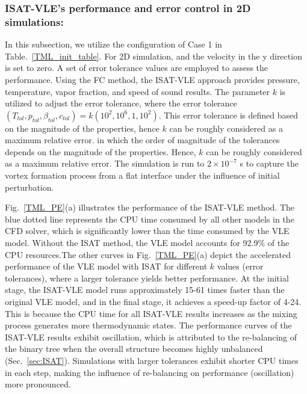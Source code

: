 \subsubsection{ISAT-VLE's performance and error control in 2D simulations:}





In this subsection, we utilize the configuration of Case 1 in Table.~\ref{TML_init_table}. For 2D simulation, and the velocity in the y direction is set to zero. A set of error tolerance values are employed to assess the performance.  Using the FC method, the ISAT-VLE approach provides pressure, temperature, vapor fraction, and speed of sound results. The parameter $k$ is utilized to adjust the error tolerance, where the error tolerance $(T_{tol},p_{tol},\beta_{tol},c_{tol})= k (10^2, 10^6, 1, 10^2)$. This error tolerance is defined based on the magnitude of the properties, hence $k$ can be roughly considered as a maximum relative error. in which the order of magnitude of the tolerances depends on the magnitude of the properties. Hence, $k$ can be roughly considered as a maximum relative error. The simulation is run to $2\times 10^{-7}$ s to capture the vortex formation process from a flat interface under the influence of initial perturbation. 

Fig.~\ref{TML_PE}(a) illustrates the performance of the ISAT-VLE method. The blue dotted line represents the CPU time consumed by all other models in the CFD solver, which is significantly lower than the time consumed by the VLE model. Without the ISAT method, the VLE model accounts for 92.9\% of the CPU resources.The other curves in Fig.~\ref{TML_PE}(a) depict the accelerated performance of the VLE model with ISAT for different $k$ values (error tolerances), where a larger tolerance yields better performance. At the initial stage, the ISAT-VLE model runs approximately 15-61 times faster than the original VLE model, and in the final stage, it achieves a speed-up factor of 4-24. This is because the CPU time for all ISAT-VLE results increases as the mixing process generates more thermodynamic states. The performance curves of the ISAT-VLE results exhibit oscillation, which is attributed to the re-balancing of the binary tree when the overall structure becomes highly unbalanced (Sec.~\ref{sec:ISAT}). Simulations with larger tolerances exhibit shorter CPU times in each step, making the influence of re-balancing on performance (oscillation) more pronounced.


